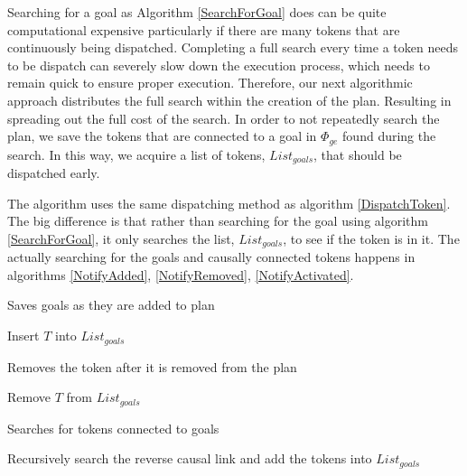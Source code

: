 Searching for a goal as Algorithm \ref{SearchForGoal} does can be
quite computational expensive particularly if there are many tokens
that are continuously being dispatched. Completing a full search every
time a token needs to be dispatch can severely slow down the execution
process, which needs to remain quick to ensure proper
execution. Therefore, our next algorithmic approach distributes the
full search within the creation of the plan.  Resulting in spreading out the full cost of the
search. In order to not repeatedly search the plan, we save the tokens
that are connected to a goal in $\Phi_{ge}$ found during the
search. In this way, we acquire a list of tokens, $List_{goals}$, that should be
dispatched early.

The algorithm uses the same dispatching method as algorithm \ref{DispatchToken}.
The big difference is that rather than searching for the goal using algorithm \ref{SearchForGoal}, 
it only searches the list, $List_{goals}$, to see if the token is in it. The actually searching for the goals and causally 
connected tokens happens in algorithms \ref{NotifyAdded}, \ref{NotifyRemoved}, \ref{NotifyActivated}.

\begin{algorithm}
\caption{Saves goals as they are added to plan}
\label{NotifyAdded}
\begin{algorithmic}
	\State Insert $T$ into $List_{goals}$
\EndIf 
\EndFunction
\end{algorithmic}
\end{algorithm}

\begin{algorithm}
\caption{Removes the token after it is removed from the plan}
\label{NotifyRemoved}
\begin{algorithmic}
	\State Remove $T$ from $List_{goals}$
\EndFunction
\end{algorithmic}
\end{algorithm}

\begin{algorithm}
\caption{Searches for tokens connected to goals}
\label{NotifyActivated}
\begin{algorithmic}
	\State Recursively search the reverse causal link and add the tokens into $List_{goals}$
\EndIf
\EndFunction
\end{algorithmic}
\end{algorithm}

